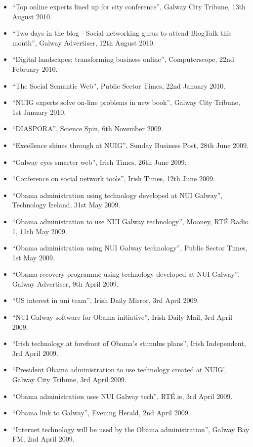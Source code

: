 \documentclass[10pt,a4paper]{res} %
\begin{document}
\begin{resume}
{\begin{itemize}
\item ``Top online experts lined up for city conference'', Galway City Tribune, 13th August 2010.
\item ``Two days in the blog - Social networking gurus to attend BlogTalk this month'', Galway Advertiser, 12th August 2010.
\item ``Digital landscapes: transforming business online'', Computerscope, 22nd February 2010.
\item ``The Social Semantic Web'', Public Sector Times, 22nd January 2010.
\item ``NUIG experts solve on-line problems in new book'', Galway City Tribune, 1st January 2010.
\item ``DIASPORA'', Science Spin, 6th November 2009.
\item ``Excellence shines through at NUIG'', Sunday Business Post, 28th June 2009.
\item ``Galway eyes smarter web'', Irish Times, 26th June 2009.
\item ``Conference on social network tools'', Irish Times, 12th June 2009.
\item ``Obama administration using technology developed at NUI Galway'', Technology Ireland, 31st May 2009.
\item ``Obama administration to use NUI Galway technology'', Mooney, RT\'{E} Radio 1, 11th May 2009.
\item ``Obama administration using NUI Galway technology'', Public Sector Times, 1st May 2009.
\item ``Obama recovery programme using technology developed at NUI Galway'', Galway Advertiser, 9th April 2009.
\item ``US interest in uni team'', Irish Daily Mirror, 3rd April 2009.
\item ``NUI Galway software for Obama initiative'', Irish Daily Mail, 3rd April 2009.
\item ``Irish technology at forefront of Obama's stimulus plans'', Irish Independent, 3rd April 2009.
\item ``President Obama administration to use technology created at NUIG', Galway City Tribune, 3rd April 2009.
\item ``Obama administration uses NUI Galway tech'', RT\'{E}.ie, 3rd April 2009.
\item ``Obama link to Galway'', Evening Herald, 2nd April 2009.
\item ``Internet technology will be used by the Obama administration'', Galway Bay FM, 2nd April 2009.

\end{itemize}}
\end{resume}
\end{document}
